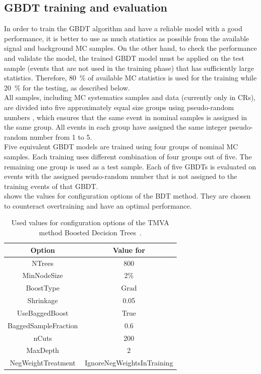 \subsection {GBDT training and evaluation}
In order to train the GBDT algorithm and have a reliable model with a good performance, it is better to use as much statistics as possible from the available signal and background MC samples.
On the other hand, to check the performance and validate the model, 
the trained GBDT model must be applied on the test sample (events that are not used in the training phase) that has sufficiently large statistics. 
Therefore, \SI{80}{\%} of available MC statistics is used for the training while \SI{20}{\%} 
for the testing, as described below.\\
All samples, including MC systematics samples and data (currently only in CRs), are divided into five approximately equal size groups using pseudo-random numbers%
, which 
ensures that the same event in nominal samples %
is assigned in the same group.  
All events in each group have assigned the same integer pseudo-random number from 1 to 5.\\ 
Five equivalent GBDT models are trained using four groups of nominal MC samples. 
Each training uses different combination of four groups out of five. 
The remaining one group is used as a test sample.
Each of five GBDTs is evaluated on events with the assigned pseudo-random number
that is not assigned to the training events of that GBDT. \\
 shows the values for configuration options of the BDT method.
They are chosen to counteract overtraining
and have an optimal performance.
\begin{table}[!htbp]
	\small
	\centering 
	\begin{tabular}{cc}
		\toprule
		Option & Value for \Dthree \\
		\hline
		NTrees & 800 \\ 
		MinNodeSize & 2\% \\
		BoostType & Grad \\
		Shrinkage & 0.05 \\
		UseBaggedBoost  & True \\
		BaggedSampleFraction & 0.6\\
		nCuts  & 200 \\
		MaxDepth &  2\\
		NegWeightTreatment & IgnoreNegWeightsInTraining\\
		\bottomrule
	\end{tabular}
	\caption{
	Used values for configuration options of the TMVA method Boosted Decision Trees~\cite{TMVA}. 
}%
\label{tab:BDTparam}
\end{table}
\FloatBarrier

